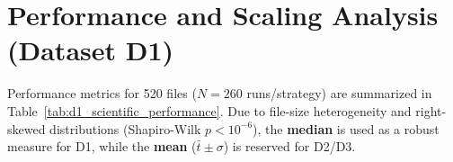 \documentclass[12pt]{article}
\begin{document}

\begingroup
\makeatletter
\let\oldthebibliography\thebibliography
\let\endoldthebibliography\endthebibliography
\renewcommand{\thebibliography}[1]{%
  \oldthebibliography{#1}%
  \setlength{\itemsep}{-0.5ex}%
  \setlength{\parskip}{4pt}%
  \setlength{\parsep}{0pt}%
  \setlength{\topsep}{0pt}%
}
\makeatother

\endgroup

\appendix

\section{Performance and Scaling Analysis (Dataset D1)}
\label{sec:results_d1}

Performance metrics for 520 files ($N=260$ runs/strategy) are summarized in Table~\ref{tab:d1_scientific_performance}. Due to file-size heterogeneity and right-skewed distributions (Shapiro-Wilk $p < 10^{-6}$), the \textbf{median} is used as a robust measure for D1, while the \textbf{mean} ($\bar{t} \pm \sigma$) is reserved for D2/D3.
\end{document}
